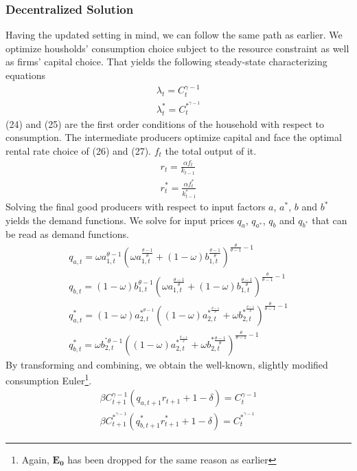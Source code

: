 \documentclass{article}
\begin{document}
\subsubsection{Decentralized Solution}

Having the updated setting in mind, we can follow the same path as earlier. We optimize housholds' consumption choice subject to the resource constraint as well as firms' capital choice. That yields the following steady-state characterizing equations 
\begin{align}
\lambda_t = C_t^{\gamma-1} \\
\lambda_t^* = C_t^{*^{\gamma-1}}
\end{align}
(24) and (25) are the first order conditions of the household with respect to consumption. The intermediate producers optimize capital and face the optimal rental rate choice of (26) and (27). $f_t$ the total output of it.
\begin{align}
r_t = \frac{\alpha f_t}{k_{t-1}} \\
r_t^* = \frac{\alpha f_t^*}{k_{t-1}^*}
\end{align}
Solving the final good producers with respect to input factors $a$, $a^*$, $b$ and $b^*$ yields the demand functions. We solve for input prices $q_a$, $q_{a^*}$, $q_b$ and $q_{b^*}$ that can be read as demand functions.
\begin{align}
q_{a,t} = \omega a_{1,t}^{\theta-1} (\omega a_{1, t}^{\frac{\theta-1}{\theta}} + (1- \omega) b_{1,t}^{\frac{\theta-1}{\theta}})^{\frac{\theta}{\theta-1} -1} \\
q_{b,t} = (1-\omega) b_{1,t}^{\theta-1} (\omega a_{1,t}^{\frac{\theta-1}{\theta}} + (1-\omega) b_{1,t}^{\frac{\theta-1}{\theta}})^{\frac{\theta}{\theta-1} -1} \\
q_{a,t}^* = (1-\omega) a_{2,t}^{*^{\theta-1}} ((1-\omega) a_{2,t}^{*^{\frac{\theta-1}{\theta}}}+ \omega b_{2,t}^{*^{\frac{\theta-1}{\theta}}})^{\frac{\theta}{\theta-1} -1} \\
q_{b,t}^* = \omega b_{2,t}^{^*{\theta-1}} ((1-\omega) a_{2,t}^{*^{\frac{\theta-1}{\theta}}} + \omega b_{2,t}^{*{\frac{\theta-1}{\theta}}})^{\frac{\theta}{\theta-1}-1}
\end{align}
By transforming and combining, we obtain the well-known, slightly modified consumption Euler\footnote{Again, $\mathbf{E_0}$ has been dropped for the same reason as earlier}.
\begin{align}
\beta C_{t+1}^{\gamma-1} (q_{a,t+1} r_{t+1} + 1 - \delta)= C_t^{\gamma-1} \\
\beta C_{t+1}^{*^{\gamma-1}} (q_{b,t+1}^* r_{t+1}^* + 1 - \delta)= C_t^{*^{\gamma-1}} 
\end{align}
\end{document}
